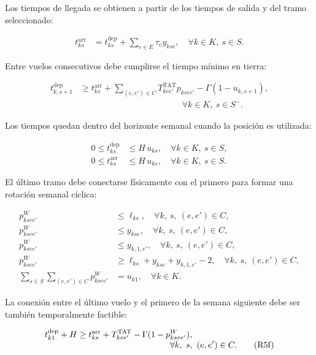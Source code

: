 Los tiempos de llegada se obtienen a partir de los tiempos de salida y del tramo seleccionado:

\begin{align}
t_{ks}^{\mathrm{arr}}
&=
t_{ks}^{\mathrm{dep}}
+
\sum_{e\in E}\tau_e y_{kse},
\quad
\forall k\in K,\ s\in S.
\tag{R4a}
\label{eq:r4a}
\end{align}

Entre vuelos consecutivos debe cumplirse el tiempo mínimo en tierra:

\begin{align}
t_{k,s+1}^{\mathrm{dep}}
&\geq
t_{ks}^{\mathrm{arr}}
+
\sum_{(e,e')\in C}
T_{kee'}^{\mathrm{TAT}}p_{ksee'}
-
\Gamma(1-u_{k,s+1}),
\nonumber\\[-1mm]
&\hspace{5cm}
\forall k\in K,\ s\in S^-.
\tag{R4b}
\label{eq:r4b}
\end{align}

Los tiempos quedan dentro del horizonte semanal cuando la posición es utilizada:

\begin{align}
0
\leq t_{ks}^{\mathrm{dep}}
&\leq
H\,u_{ks},
\quad
\forall k\in K,\ s\in S,
\tag{R4c}
\label{eq:r4c}
\\
0
\leq t_{ks}^{\mathrm{arr}}
&\leq
H\,u_{ks},
\quad
\forall k\in K,\ s\in S.
\tag{R4d}
\label{eq:r4d}
\end{align}

El último tramo debe conectarse físicamente con el primero para formar una rotación semanal
cíclica:

\begin{align}
p^W_{ksee'}
&\leq
\ell_{ks},
\quad
\forall k,\ s,\ (e,e')\in C,
\tag{R5a}
\label{eq:r5a}
\\
p^W_{ksee'}
&\leq
y_{kse},
\quad
\forall k,\ s,\ (e,e')\in C,
\tag{R5b}
\label{eq:r5b}
\\
p^W_{ksee'}
&\leq
y_{k,1,e'},
\quad
\forall k,\ s,\ (e,e')\in C,
\tag{R5c}
\label{eq:r5c}
\\
p^W_{ksee'}
&\geq
\ell_{ks}+y_{kse}+y_{k,1,e'}-2,
\quad
\forall k,\ s,\ (e,e')\in C,
\tag{R5d}
\label{eq:r5d}
\\
\sum_{s\in S}\sum_{(e,e')\in C}
p^W_{ksee'}
&=
u_{k1},
\quad
\forall k\in K.
\tag{R5e}
\label{eq:r5e}
\end{align}

La conexión entre el último vuelo y el primero de la semana siguiente debe ser también
temporalmente factible:

\begin{align}
t_{k1}^{\mathrm{dep}}+H
&\geq
t_{ks}^{\mathrm{arr}}
+
T_{kee'}^{\mathrm{TAT}}
-
\Gamma(1-p^W_{ksee'}),
\nonumber\\[-1mm]
&\hspace{3.8cm}
\forall k,\ s,\ (e,e')\in C.
\tag{R5f}
\label{eq:r5f}
\end{align}


